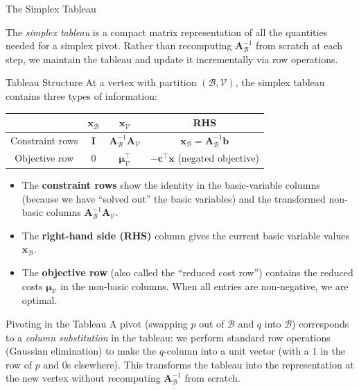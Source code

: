 \documentclass[aspectratio=169,10pt]{beamer}
\newcommand{\xv}{\mathbf{x}}
\newcommand{\cv}{\mathbf{c}}
\newcommand{\bv}{\mathbf{b}}
\newcommand{\Av}{\mathbf{A}}
\newcommand{\muv}{\boldsymbol{\mu}}
\newcommand{\calB}{\mathcal{B}}
\newcommand{\calV}{\mathcal{V}}
\begin{document}
\begin{frame}[allowframebreaks]{The Simplex Tableau}

The \emph{simplex tableau} is a compact matrix representation of all the quantities
needed for a simplex pivot.  Rather than recomputing $\Av_\calB^{-1}$ from scratch
at each step, we maintain the tableau and update it incrementally via row operations.

\begin{block}{Tableau Structure}
At a vertex with partition $(\calB, \calV)$, the simplex tableau contains three types
of information:

\begin{center}
\begin{tabular}{c|c|c|c}
 & $\xv_\calB$ & $\xv_\calV$ & RHS \\\hline
Constraint rows & $\mathbf{I}$ & $\Av_\calB^{-1}\Av_\calV$ & $\xv_\calB = \Av_\calB^{-1}\bv$ \\\hline
Objective row & $0$ & $\muv_\calV^\top$ & $-\cv^\top\xv$ (negated objective)
\end{tabular}
\end{center}

\begin{itemize}
  \item The \textbf{constraint rows} show the identity in the basic-variable columns
        (because we have ``solved out'' the basic variables) and the transformed
        non-basic columns $\Av_\calB^{-1}\Av_\calV$.
  \item The \textbf{right-hand side (RHS)} column gives the current basic variable
        values $\xv_\calB$.
  \item The \textbf{objective row} (also called the ``reduced cost row'') contains
        the reduced costs $\muv_\calV$ in the non-basic columns.  When all entries
        are non-negative, we are optimal.
\end{itemize}
\end{block}

\begin{block}{Pivoting in the Tableau}
A pivot (swapping $p$ out of $\calB$ and $q$ into $\calB$) corresponds to a
\emph{column substitution} in the tableau: we perform standard row operations
(Gaussian elimination) to make the $q$-column into a unit vector (with a $1$
in the row of $p$ and $0$s elsewhere).  This transforms the tableau into the
representation at the new vertex without recomputing $\Av_\calB^{-1}$ from scratch.
\end{block}


\end{frame}
\end{document}
